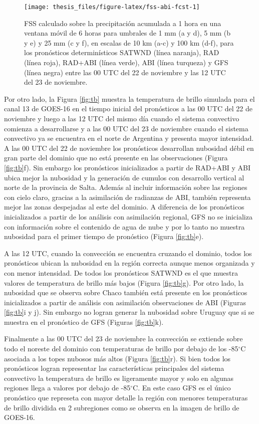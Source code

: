 \documentclass[12pt,oneside,a4paper]{reedthesis}
\begin{document}
\begin{figure}
\texttt{[image: thesis\_files/figure-latex/fss-abi-fcst-1]} \caption{FSS calculado sobre la precipitación acumulada a 1 hora en una ventana móvil de 6 horas para umbrales de 1 mm (a y d), 5 mm (b y e) y 25 mm (c y f), en escalas de 10 km (a-c) y 100 km (d-f), para los pronósticos determinísticos SATWND (línea naranja), RAD (línea roja), RAD+ABI (línea verde), ABI (línea turqueza) y GFS (línea negra) entre las 00 UTC del 22 de noviembre y las 12 UTC del 23 de noviembre.}\label{fig:fss-abi-fcst}
\end{figure}
Por otro lado, la Figura \ref{fig:tb} muestra la temperatura de brillo simulada para el canal 13 de GOES-16 en el tiempo inicial del pronósticos a las 00 UTC del 22 de noviembre y luego a las 12 UTC del mismo día cuando el sistema convectivo comienza a desarrollarse y a las 00 UTC del 23 de noviembre cuando el sistema convectivo ya se encuentra en el norte de Argentina y presenta mayor intensidad. A las 00 UTC del 22 de noviembre los pronósticos desarrollan nubosidad débil en gran parte del dominio que no está presente en las observaciones (Figura \ref{fig:tb}f). Sin embargo los pronósticos inicializados a partir de RAD+ABI y ABI ubica mejor la nubosidad y la generación de cumulos con desarrollo vertical al norte de la provincia de Salta. Además al incluir información sobre las regiones con cielo claro, gracias a la asimilación de radianzas de ABI, también representa mejor las zonas despejadas al este del dominio. A diferencia de los pronósticos inicializados a partir de los análisis con asimilación regional, GFS no se inicializa con información sobre el contenido de agua de nube y por lo tanto no muestra nubosidad para el primer tiempo de pronóstico (Figura \ref{fig:tb}e).

A las 12 UTC, cuando la convección se encuentra cruzando el dominio, todos los pronósticos ubican la nubosidad en la región correcta aunque menos organizada y con menor intensidad. De todos los pronósticos SATWND es el que muestra valores de temperatura de brillo más bajos (Figura \ref{fig:tb}g). Por otro lado, la nubosidad que se observa sobre Chaco también está presente en los pronósticos inicializados a partir de análisis con asimilación observaciones de ABI (Figuras \ref{fig:tb}i y j). Sin embargo no logran generar la nubosidad sobre Uruguay que si se muestra en el pronóstico de GFS (Figuras \ref{fig:tb}k).

Finalmente a las 00 UTC del 23 de noviembre la convección se extiende sobre todo el noreste del dominio con temperaturas de brillo por debajo de los -85\(^\circ\)C asociada a los topes nubosos más altos (Figura \ref{fig:tb}r). Si bien todos los pronósticos logran representar las características principales del sistema convectivo la temperatura de brillo es ligeramente mayor y solo en algunas regiones llega a valores por debajo de -85\(^\circ\)C. En este caso GFS es el único pronóstico que represeta con mayor detalle la región con menores temperaturas de brillo dividida en 2 subregiones como se observa en la imagen de brillo de GOES-16.
\end{document}
